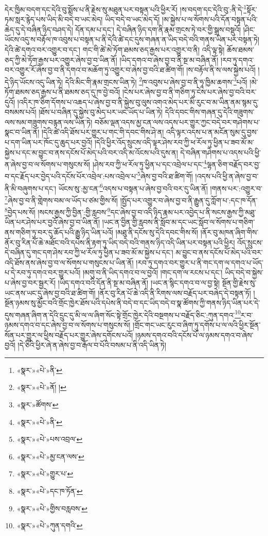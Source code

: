 དེར་ཁྱིམ་བདག་དང་དེའི་བུ་སྨོས་པ་ནི་རྗེས་སུ་མཐུན་པར་བསྟན་པའི་ཕྱིར་རོ། །ས་བདག་དང་དེའི་བུ་:ནི་དེ་\footnote{«སྣར་»«པེ་»ནི་}སྟོར་ཏམ་སླར་རྙེད་པས་ཡིད་མི་བདེ་བ་ཡང་མེད། ཡིད་བདེ་བ་ཡང་མེད་དོ། །མ་སྐྱེས་པ་ལ་སོགས་པའི་དོན་བསྟན་པའི་ཆེད་དུ་དེ་བཞིན་ཉིད་བཤད་དེ། དོན་དམ་པ་དང་། དེ་བཞིན་ཉིད་དག་ནི་རྣམ་གྲངས་ཏེ་བར་གྱི་སྒྲས་བསྡུའོ། །ཤིང་ཡོངས་འདུ་ས་བརྟོལ་ཁ་འབུས་པ་བསྟན་པ་ནི་དེའི་ཚེ་དང་དུས་གཞན་ན་ཡིད་བདེ་བའི་གནས་ཡིན་པར་བསྟན་ཏེ། དེའི་ཚེ་དགའ་བར་འགྱུར་བ་དང་། གང་གི་ཚེ་མེ་ཏོག་ཐམས་ཅད་རྒྱས་པར་འགྱུར་བ་ནི། འདི་ལྟ་སྟེ། ཆོས་ཐམས་ཅད་ཀྱི་མེ་ཏོག་རྒྱས་པར་འགྱུར་ཞེས་བྱ་བ་ཡིན་ནོ། །ཡིད་དགའ་བ་ཞེས་བྱ་བ་ནི་སྔ་མ་བཞིན་ནོ། །རབ་ཏུ་དགའ་བར་འགྱུར་རོ་ཞེས་བྱ་བ་ནི་དགའ་བ་མཆོག་ཏུ་འགྱུར་བ་ཞེས་བྱ་བའི་ཐ་ཚིག་གོ། །ས་བརྟོལ་ནི་ས་ལས་སྐྱེས་པའོ། །དེ་ཉིད་ཡོངས་འདུ་ཡིན་ཏེ། དེའི་མིང་གི་རྣམ་གྲངས་ཡིན་ཏེ། \footnote{«སྣར་»«པེ་»ནོ། ། }ཁ་འབུས་པ་ཞེས་བྱ་བ་ནི་ཧཱ་ཁྱིམ་ཆགས་\footnote{«སྣར་»ཚོགས་}པའོ། །མེ་ཏོག་ཐམས་ཅད་རྒྱས་པ་ནི་ཐམས་ཅད་དུ་ཁ་བྱེ་བའོ། །ངེས་པར་ཞེས་བྱ་བ་ནི་གཅིག་ཏུ་ངེས་པར་ཞེས་བྱ་བའི་བར་དུའོ། །འདིར་ཁ་ཅིག་དོགས་པ་འཆད་པ་ཞེས་བྱ་བ་ནི་སྐྱེས་བུ་ལུས་འགའ་མེད་པར་མི་རུང་བ་མ་ཡིན་ནམ་སྙམ་དུ་བསམས་པའོ། །ཐོས་པ་བཞིན་དུ་སྐྱེས་བུ་མེད་པར་ཡང་ཡོད་པ་ཡིན་ཏེ། དེའི་དབང་གིས་གཞན་དུ་དེའི་གཟུགས་ལས་སམ་གཟུགས་བརྙན་ལས་ཡིན་ཏེ། བཅོམ་ལྡན་འདས་མྱ་ངན་ལས་འདས་པར་གྱུར་ཀྱང་བདེ་བར་གཤེགས་པ་སྣང་བ་ཡིན་ནོ། །དེའི་ཚེ་འདི་ཐོས་པར་གྱུར་པ་གང་གི་དབང་གིས་ཤེ་ན། འདི་ལྟར་འདས་པ་ན་མངོན་སུམ་དུ་བྱས་པ་དག་ཡིན་པར་ཁོང་དུ་ཆུད་པར་བྱའོ། །དེའི་ཕྱིར་འོད་སྲུངས་འདི་ལྟར་ཤེས་རབ་ཀྱི་ཕ་རོལ་ཏུ་ཕྱིན་པ་ཟབ་མོ་མ་སྐྱེས་པ་དང་མ་བྱུང་བ་ནས་དངོས་པོ་མེད་པའི་བར་འདི་མ་འོངས་པའི་དུས་ན། དེ་བཞིན་གཤེགས་པ་འདས་པའི་ཕྱི་ན་ཞེས་བྱ་བ་ལ་སོགས་པ་གསུངས་སོ། །ཤེས་རབ་ཀྱི་ཕ་རོལ་ཏུ་ཕྱིན་པ་དང་འབྲེལ་པ་དང་\footnote{«སྣར་»«པེ་»ནི་}ལྷན་ཅིག་བརྗོད་བར་བྱ་བ་དང་རྗོད་པར་བྱེད་པའི་དངོས་པོར་འབྲེལ་:པས་འབྲེལ་པ་\footnote{«སྣར་»«པེ་»པས་འབྲལ་}ཞེས་བྱ་བའི་ཐ་ཚིག་གོ། །འདས་པའི་ཕྱི་ན་ཞེས་བྱ་བ་ནི་མི་བཞུགས་པ་དང་། ཡོངས་སུ་:མྱ་ངན་\footnote{«སྣར་»«པེ་»མྱ་ངན་ལས་}འདས་པ་བསྟན་པ་ཞེས་བྱ་བའི་བར་དུ་ཡིན་ནོ། །གནས་པར་:འགྱུར་བ་\footnote{«སྣར་»«པེ་»གྱུར་པ་}ཞེས་བྱ་བ་ནི་གླེགས་བམ་ལ་ཡོད་པ་ཙམ་གྱིས་སོ། །སྤྱོད་པར་འགྱུར་བ་ཞེས་བྱ་བ་ནི་རྒྱུན་དུ་ཀློག་པ་:དང་ཁ་དོན་\footnote{«སྣར་»«པེ་»དང་ཁ་ཏོན་}བྱེད་པས་སོ། །སངས་རྒྱས་ཀྱི་བྱིན་:གྱི་རླབས་\footnote{«སྣར་»«པེ་»གྱིས་བརླབས་}དང་ཞེས་བྱ་བ་འདི་ཉིད་རྣམ་པར་འབྱེད་པ་ནི་སངས་རྒྱས་ཀྱི་མཐུ་ཡིན་པར་ཤེས་པར་བྱའོ་ཞེས་བྱ་བ་ཡིན་ནོ། །ཡང་ན་བྱིན་གྱི་རླབས་ནི་སློབ་མ་དང་ཡང་སློབ་ལ་སོགས་པ་གཅིག་ནས་གཅིག་ཏུ་བར་དུ་ཆོད་པའི་རྒྱུ་ཉིད་ཡིན་པའོ། །མཐུ་ནི་དངོས་སུ་དེའི་དབང་གིས་སོ། །ནོར་བུ་མཁན་ཞིག་གིས་ནོར་བུ་རིན་པོ་ཆེ་མཐོང་བའི་དཔེས་ནི་རྟག་ཏུ་ཡིད་བདེ་བའི་གནས་ཉིད་འདི་ཡིན་པར་བསྟན་པའི་ཕྱིར། འོད་སྲུངས་དེ་བཞིན་དུ་གང་དག་ཤེས་རབ་ཀྱི་ཕ་རོལ་ཏུ་ཕྱིན་པ་ཟབ་མོ་མ་སྐྱེས་པ་དང་། མ་བྱུང་བ་ནས་དངོས་པོ་མེད་པའི་བར་འདི་ཐོས་ནས་ཞེས་བྱ་བ་ལ་སོགས་པ་གསུངས་པ་ཡིན་ནོ། །རབ་ཏུ་དགའ་བར་གྱུར་པ་ནི་གང་དག་ལ་དགའ་པ་ཡོད་པ་དེ་རབ་ཏུ་དགའ་བར་གྱུར་པའོ། །མགུ་བ་ནི་ཡིད་དགའ་བ་ལ་བྱའོ། །གང་དག་ལ་རངས་པ་དང་། ཡིད་བདེ་བ་སྐྱེས་པ་ཞེས་བྱ་བར་སྦྱར་རོ། །ཡིད་དགའ་བའི་དོན་ནི་སྔ་མ་བཞིན་ནོ། །ཡང་ན་སྙིང་དགའ་བ་ལ་བྱ་སྟེ། སྔོན་གྱི་རྗེས་སུ་ཡང་ནས་ཡང་དུ་ཞེས་བྱ་བའི་ཐ་ཚིག་གོ། །ནོར་བུ་རིན་པོ་ཆེ་འདི་ནི་རིགས་ལས་བརྗོད་པར་བཞེད་དེ་བསྟན་ཏོ། །སྔོན་ཉམས་སུ་མྱོང་བའི་གྲོང་ཁྱེར་ཐོས་པའི་དཔེས་ནི་བདེ་བ་དང་ཡིད་བདེ་བ་སྣ་ཚོགས་ཀྱི་གནས་ཉིད་ཡིན་པར་དེ་དུས་གཞན་ཞིག་ན་དེའི་དྲུང་དུ་མི་ལ་ལ་ཞིག་སོང་སྟེ་གྲོང་ཁྱེར་དེའི་བསྔགས་པ་བརྗོད་ཅིང་:ཀུན་དགའ་\footnote{«སྣར་»«པེ་»ཀུན་དགའི་}ར་བ་ཉམས་དགའ་བ་དང་ཞེས་བྱ་བ་ལ་སོགས་པ་གསུངས་སོ། །གྲོང་གང་ཡང་རུང་བ་ཞིག་ཏུ་དགོས་པ་ལ་ལའི་ཕྱིར་སྔོན་སོན་པར་གྱུར་ལ་ཕྱིས་བརྗོད་པར་གྱུར་ཞེས་དགོངས་པའོ། །ཉམས་དགའ་བའི་དངོས་པོ་ལ་ཉམས་དགའ་བ་ཞེས་བྱའོ། །དེ་ཅིའི་ཕྱིར་ཞེ་ན་ཞེས་བྱ་བ་རྒོལ་བ་པོའི་བསམ་པ་ནི་འདི་ཡིན་ཏེ། 